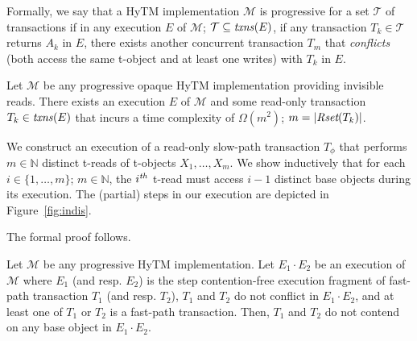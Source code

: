 Formally, we say that a HyTM implementation $\mathcal{M}$ is progressive
for a set $\mathcal{T}$ of transactions
if in any execution $E$ of $\mathcal{M}$; $\mathcal{T} \subseteq \ms{txns}(E)$, 
if any transaction $T_k \in \mathcal{T}$ returns $A_k$ in $E$, there exists 
another concurrent transaction $T_m$ that \emph{conflicts} (both access the same t-object and at least one writes) with $T_k$ in $E$.
%
\begin{theorem}
\label{th:impossibility}
Let $\mathcal{M}$ be any progressive opaque HyTM implementation providing invisible reads.
There exists an execution $E$ of $\mathcal{M}$ and some read-only transaction $T_k \in \ms{txns}(E)$
that incurs a time complexity of $\Omega (m^2)$; $m=|\textit{Rset}(T_k)|$.
\end{theorem}
%
\begin{proofsketch}
%
We construct an execution of a read-only slow-path transaction $T_{\phi}$ that performs $m \in \mathbb{N}$
distinct t-reads of t-objects $X_1,\ldots , X_m$. We show inductively that for each 
$i\in \{1,\ldots , m\}$; $m \in \mathbb{N}$, the $i^{\ms{th}}$ t-read must access $i-1$ distinct base objects
during its execution. The (partial) steps in our execution are depicted in Figure~\ref{fig:indis}.
\end{proofsketch}
%
The formal proof follows.
%
\begin{lemma}
\label{lm:hytm}
%
Let $\mathcal{M}$ be any progressive HyTM implementation.
Let $E_1 \cdot E_2$ be an execution of $\mathcal{M}$ where
$E_1$ (and resp. $E_2$) is the step contention-free
execution fragment of fast-path transaction $T_1$ (and resp. $T_2$),
$T_1$ and $T_2$ do not conflict in $E_1 \cdot E_2$, and
at least one of $T_1$ or $T_2$ is a fast-path transaction. 
Then, $T_1$ and $T_2$ do not contend on any base object in $E_1 \cdot E_2$.
\end{lemma}
%
